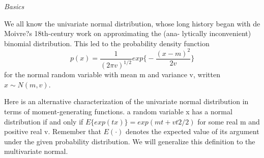 \documentclass{homework}
\begin{document}
\textit{Basics}
\par \noindent We all know the univariate normal distribution, whose long history began with de Moivre?s 18th-century work on approximating the (ana- lytically inconvenient) binomial distribution. This led to the probability density function 
$$p( x ) = \frac{1}{{(2\pi v)}^{1/2}} exp\big\{-\frac{(x - m)^2}{2v}\big\}$$
for the normal random variable with mean m and variance v, written $x \sim N(m, v)$.

\par \noindent Here is an alternative characterization of the univariate normal distribution in terms of moment-generating functions.  a random variable x has a normal distribution if and only if $E \{exp(tx)\} = exp(mt + vt2/2)$ for some real m and positive real v. Remember that $E(\cdot)$ denotes the expected value of its argument under the given probability distribution. We will generalize this definition to the multivariate normal.
\end{document}
